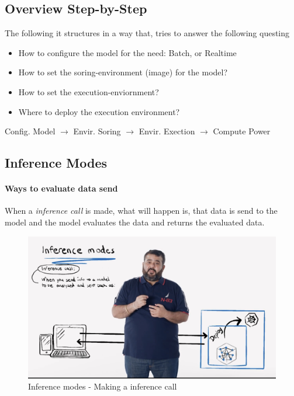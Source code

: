 \subsection{Overview Step-by-Step}
The following it structures in a way that, tries to answer the following questing
\begin{itemize}
	\item How to configure the model for the need: Batch, or Realtime
	\item How to set the soring-environment (image) for the model?
	\item How to set the execution-enviornment?
	\item Where to deploy the execution environment?
\end{itemize}
\begin{center}
Config. Model $\rightarrow$ Envir. Soring $\rightarrow$ Envir. Exection $\rightarrow$ Compute Power \\
\end{center}

\subsection{Inference Modes}
\paragraph{Ways to evaluate data send}
When a \textit{inference call} is made, what will happen is, that data is send to the model and the model evaluates the data and returns the evaluated data.
\begin{figure}[H]
	\centering
	\includegraphics[scale = 0.1]{attachment/chapter_10/Scc011}
	\caption{Inference modes - Making a inference call}
\end{figure}

